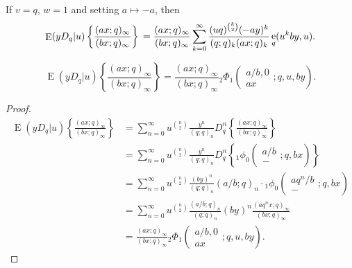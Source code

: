 \documentclass{cimart}
\DeclareMathOperator{\ope}{e}
\DeclareMathOperator{\opE}{E}
\begin{document}
\begin{corollary}\label{coro3}
If $v=q$, $w=1$ and setting $a\mapsto-a$, then
\begin{equation}\label{eqn_coro2b}
    \opE(yD_{q}|u)\left\{\frac{(ax;q)_{\infty}}{(bx;q)_{\infty}}\right\}\\
        =\frac{(ax;q)_{\infty}}{(bx;q)_{\infty}}\sum_{k=0}^{\infty}\frac{(uq)^{\binom{k}{2}}(-ay)^k}{(q;q)_{k}(ax;q)_{k}}\ope_{q}(u^{k}by,u).
\end{equation}
\end{corollary}

\begin{theorem}\label{theo_oper_ax/bx}
    \begin{equation}
        \opE(yD_{q}|u)\left\{\frac{(ax;q)_{\infty}}{(bx;q)_{\infty}}\right\}=\frac{(ax;q)_{\infty}}{(bx;q)_{\infty}}{}_{2}\Phi_{1}\left(
        \begin{array}{c}
             a/b,0 \\
             ax
        \end{array};
        q,u,by
        \right).
    \end{equation}
\end{theorem}
\begin{proof}
    \begin{align*}
        \opE(yD_{q}|u)\left\{\frac{(ax;q)_{\infty}}{(bx;q)_{\infty}}\right\}        &=\sum_{n=0}^{\infty}u^{\binom{n}{2}}\frac{y^n}{(q;q)_{n}}D_{q}^n\left\{\frac{(ax;q)_{\infty}}{(bx;q)_{\infty}}\right\}\\
        &=\sum_{n=0}^{\infty}u^{\binom{n}{2}}\frac{y^n}{(q;q)_{n}}D_{q}^n\left\{{}_{1}\phi_{0}\left(
    \begin{array}{c}
         a/b\\
         -
    \end{array}
    ;q,bx
    \right)\right\}\\
    &=\sum_{n=0}^{\infty}u^{\binom{n}{2}}\frac{(by)^n}{(q;q)_{n}}(a/b;q)_{n}\cdot{}_{1}\phi_{0}\left(
    \begin{array}{c}
         aq^n/b\\
         -
    \end{array}
    ;q,bx
    \right)\\
    &=\sum_{n=0}^{\infty}u^{\binom{n}{2}}\frac{(a/b;q)_{n}}{(q;q)_{n}}(by)^{n}\frac{(aq^nx;q)_{\infty}}{(bx;q)_{\infty}}\\
    &=\frac{(ax;q)_{\infty}}{(bx;q)_{\infty}}{}_{2}\Phi_{1}\left(
    \begin{array}{c}
         a/b,0\\
         ax
    \end{array}
    ;q,u, by
    \right).
    \end{align*}
\end{proof}
\end{document}
